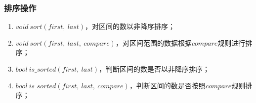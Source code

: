 \subsubsection{排序操作}
\begin{enumerate}
    \item $void\ sort(first,\ last)$，对区间的数以非降序排序；
    \item $void\ sort(first,\ last,\ compare)$，对区间范围的数据根据$ compare $规则进行排序；
    \item $bool\ is\_sorted(first,\ last)$，判断区间的数是否以非降序排序；
    \item $bool\ is\_sorted(first,\ last,\ compare)$，判断区间的数是否按照$compare$规则排序；
\end{enumerate}